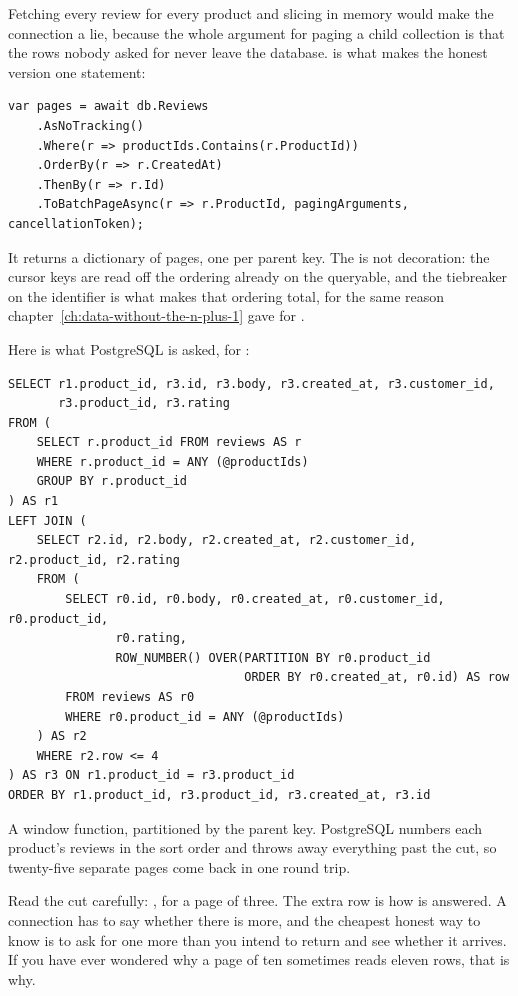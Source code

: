 Fetching every review for every product and slicing in memory would make the
connection a lie, because the whole argument for paging a child collection is
that the rows nobody asked for never leave the database.
 is what makes the honest version one statement:

\begin{verbatim}
var pages = await db.Reviews
    .AsNoTracking()
    .Where(r => productIds.Contains(r.ProductId))
    .OrderBy(r => r.CreatedAt)
    .ThenBy(r => r.Id)
    .ToBatchPageAsync(r => r.ProductId, pagingArguments, cancellationToken);
\end{verbatim}

It returns a dictionary of pages, one per parent key. The  is not
decoration: the cursor keys are read off the ordering already on the queryable,
and the tiebreaker on the identifier is what makes that ordering total, for the
same reason chapter~\ref{ch:data-without-the-n-plus-1} gave for
.

Here is what PostgreSQL is asked, for :

\begin{verbatim}
SELECT r1.product_id, r3.id, r3.body, r3.created_at, r3.customer_id,
       r3.product_id, r3.rating
FROM (
    SELECT r.product_id FROM reviews AS r
    WHERE r.product_id = ANY (@productIds)
    GROUP BY r.product_id
) AS r1
LEFT JOIN (
    SELECT r2.id, r2.body, r2.created_at, r2.customer_id, r2.product_id, r2.rating
    FROM (
        SELECT r0.id, r0.body, r0.created_at, r0.customer_id, r0.product_id,
               r0.rating,
               ROW_NUMBER() OVER(PARTITION BY r0.product_id
                                 ORDER BY r0.created_at, r0.id) AS row
        FROM reviews AS r0
        WHERE r0.product_id = ANY (@productIds)
    ) AS r2
    WHERE r2.row <= 4
) AS r3 ON r1.product_id = r3.product_id
ORDER BY r1.product_id, r3.product_id, r3.created_at, r3.id
\end{verbatim}

%
A window function, partitioned by the parent key. PostgreSQL numbers each
product's reviews in the sort order and throws away everything past the cut, so
twenty-five separate pages come back in one round trip.

Read the cut carefully: , for a page of three. The extra row is
how  is answered. A connection has to say whether there is
more, and the cheapest honest way to know is to ask for one more than you intend
to return and see whether it arrives. If you have ever wondered why a page of
ten sometimes reads eleven rows, that is why.


